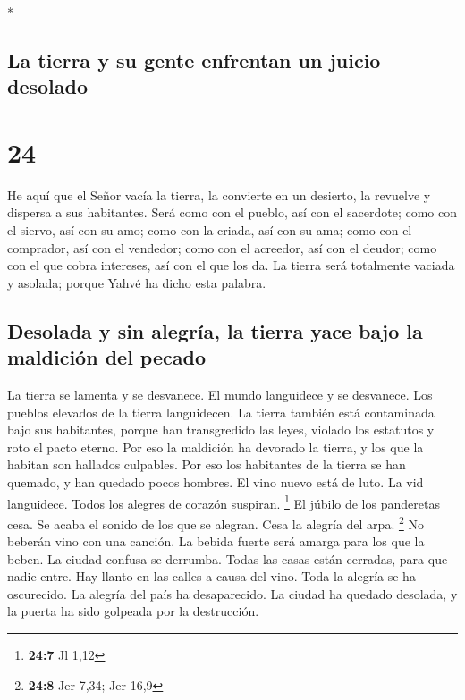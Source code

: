 \begin{paracol}{2}
\begin{otherlanguage}{english}
\end{otherlanguage}

\switchcolumn[0]*

\hypertarget{la-tierra-y-su-gente-enfrentan-un-juicio-desolado}{%
\subsection{La tierra y su gente enfrentan un juicio
desolado}\label{la-tierra-y-su-gente-enfrentan-un-juicio-desolado}}

\hypertarget{section-46}{%
\section{24}\label{section-46}}

 He aquí que el Señor vacía la tierra, la convierte en un
desierto, la revuelve y dispersa a sus habitantes.  Será
como con el pueblo, así con el sacerdote; como con el siervo, así con su
amo; como con la criada, así con su ama; como con el comprador, así con
el vendedor; como con el acreedor, así con el deudor; como con el que
cobra intereses, así con el que los da.  La tierra será
totalmente vaciada y asolada; porque Yahvé ha dicho esta palabra.

\hypertarget{desolada-y-sin-alegruxeda-la-tierra-yace-bajo-la-maldiciuxf3n-del-pecado}{%
\subsection{Desolada y sin alegría, la tierra yace bajo la maldición del
pecado}\label{desolada-y-sin-alegruxeda-la-tierra-yace-bajo-la-maldiciuxf3n-del-pecado}}

 La tierra se lamenta y se desvanece. El mundo languidece
y se desvanece. Los pueblos elevados de la tierra languidecen.
 La tierra también está contaminada bajo sus habitantes,
porque han transgredido las leyes, violado los estatutos y roto el pacto
eterno.  Por eso la maldición ha devorado la tierra, y los
que la habitan son hallados culpables. Por eso los habitantes de la
tierra se han quemado, y han quedado pocos hombres.  El
vino nuevo está de luto. La vid languidece. Todos los alegres de corazón
suspiran. \footnote{\textbf{24:7} Jl 1,12}  El júbilo de
los panderetas cesa. Se acaba el sonido de los que se alegran. Cesa la
alegría del arpa. \footnote{\textbf{24:8} Jer 7,34; Jer 16,9}
 No beberán vino con una canción. La bebida fuerte será
amarga para los que la beben.  La ciudad confusa se
derrumba. Todas las casas están cerradas, para que nadie entre.
 Hay llanto en las calles a causa del vino. Toda la
alegría se ha oscurecido. La alegría del país ha desaparecido.
 La ciudad ha quedado desolada, y la puerta ha sido
golpeada por la destrucción.


\end{paracol}
